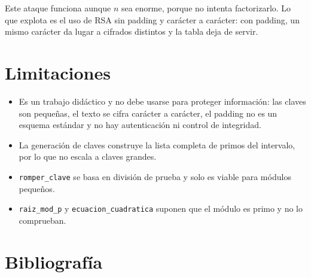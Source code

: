 \documentclass[11pt,a4paper]{article}
\newcommand{\code}[1]{\texttt{#1}}
\begin{document}
Este ataque funciona aunque $n$ sea enorme, porque no intenta factorizarlo. Lo que explota es el uso de RSA sin padding y carácter a carácter: con padding, un mismo carácter da lugar a cifrados distintos y la tabla deja de servir.

\section{Limitaciones}

\begin{itemize}
\item Es un trabajo didáctico y no debe usarse para proteger información: las claves son pequeñas, el texto se cifra carácter a carácter, el padding no es un esquema estándar y no hay autenticación ni control de integridad.
\item La generación de claves construye la lista completa de primos del intervalo, por lo que no escala a claves grandes.
\item \code{romper\_clave} se basa en división de prueba y solo es viable para módulos pequeños.
\item \code{raiz\_mod\_p} y \code{ecuacion\_cuadratica} suponen que el módulo es primo y no lo comprueban.
\end{itemize}

\section{Bibliografía}
\end{document}
